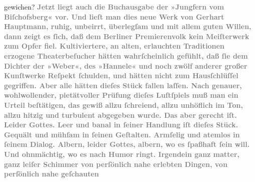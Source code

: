 \begin{ledgroupsized}[t]{13cm}
{{                  gewichen?}}\pend
           \pstart
           \textcolor{gray}{\textbf{Jetzt liegt auch die Buchausgabe der »Jungfern vom Biſchofsberg« vor. Und lieſt man dies neue
                  Werk von Gerhart Hauptmann, ruhig,
                  unbeirrt, überlegſam und mit allem guten Willen, dann zeigt es ſich, daß dem Berliner Premierenvolk kein Meiſterwerk zum
                  Opfer fiel. Kultiviertere, an alten, erlauchten Traditionen erzogene
                  Theaterbeſucher hätten wahrſcheinlich gefühlt, daß ſie dem Dichter der »Weber«, des »Hannele« und noch zwölf anderer großer Kunſtwerke Reſpekt ſchulden, und
                  hätten nicht zum Hausſchlüſſel gegriffen. Aber alle hätten dieſes Stück fallen laſſen. Nach genauer,
                  wohlwollender, pietätvoller Prüfung dieſes Luſtſpiels muß man ein Urteil
                  beſtätigen, das gewiß allzu ſchreiend, allzu unhöflich im Ton, allzu hitzig und
                  turbulent abgegeben wurde. Das aber gerecht iſt. Leider Gottes. Leer und banal in
                  ſeiner Handlung iſt dieſes Stück. Gequält und mühſam in ſeinen Geſtalten. Armſelig
                  und atemlos in ſeinem Dialog. Albern, leider Gottes, albern, wo es ſpaßhaft ſein
                  will. Und ohnmächtig, wo es nach Humor ringt. Irgendein ganz matter, ganz leiſer
                  Schimmer von perſönlich nahe erlebten Dingen, von perſönlich nahe geſchauten
}}
\end{ledgroupsized}
